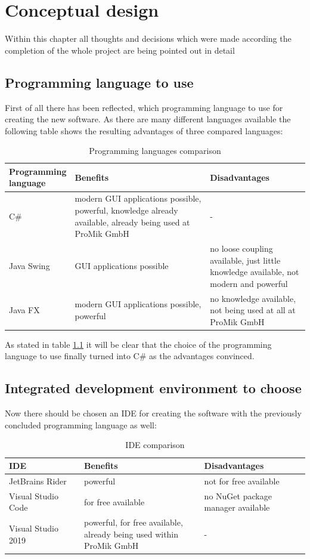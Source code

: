 \chapter{Conceptual design}
Within this chapter all thoughts and decisions which were made according the completion of the whole project are being pointed out in detail
	\section{Programming language to use}
First of all there has been reflected, which programming language to use for creating the new software. As there are many different languages available the following table shows the resulting advantages of three compared languages:

\begin{table}[ht]
    \centering
    \begin{tabular}{p{0.15\linewidth} | p{0.5\linewidth} | p{0.35\linewidth}}
      Programming language  & Benefits & Disadvantages \\ \hline
      C\# & modern GUI applications possible, powerful, knowledge already available, already being used at ProMik GmbH & - \\ \hline
      Java Swing & GUI applications possible & no loose coupling available, just little knowledge available, not modern and powerful \\ \hline
			Java FX & modern GUI applications possible, powerful & no knowledge available, not being used at all at ProMik GmbH \\ 
    \end{tabular}
    \caption{Programming languages comparison}
    \label{tab:programmingLanguages}
\end{table}

As stated in table \ref{tab:programmingLanguages} it will be clear that the choice of the programming language to use finally turned into C\# as the advantages convinced.

	\section{Integrated development environment to choose}
Now there should be chosen an \ac{IDE} for creating the software with the previously concluded programming language as well:

\begin{table}[ht]
    \centering
    \begin{tabular}{p{0.25\linewidth} | p{0.4\linewidth} | p{0.35\linewidth}}
      \ac{IDE}  & Benefits & Disadvantages \\ \hline
      JetBrains Rider & powerful & not for free available \\ \hline
      Visual Studio Code & for free available & no NuGet package manager available \\ \hline
			Visual Studio 2019 & powerful, for free available, already being used within ProMik GmbH & - \\ 
    \end{tabular}
    \caption{IDE comparison}
    \label{tab:ides}
\end{table}

